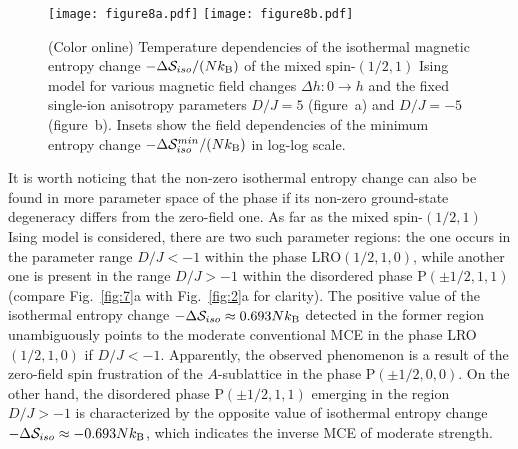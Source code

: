 \documentclass[final,5p,times,sort&compress]{elsarticle}
\begin{document}
\begin{figure*}[t!]
\centering
  \texttt{[image: figure8a.pdf]}
    \hspace{-0.25cm}
  \texttt{[image: figure8b.pdf]}
\vspace{-0.25cm}
\caption{(Color online) Temperature dependencies of the isothermal magnetic entropy change $-\Delta{\cal S}_{iso}/(Nk_{\rm B})$ of the mixed spin-$(1/2,1)$ Ising model for various magnetic field changes $\Delta h\!:0\to h$ and the fixed single-ion anisotropy parameters $D/J = 5$ (figure~a) and $D/J = -5$ (figure~b). Insets show the field dependencies of the minimum entropy change $-\Delta{\cal S}_{iso}^{min}/(Nk_{\rm B})$ in log-log scale.}
\label{fig:8}
\end{figure*}

It is worth noticing that the non-zero isothermal entropy change can also be found in more
parameter space of the phase if its non-zero ground-state degeneracy differs from the zero-field one. As far as the mixed spin-$(1/2,1)$ Ising model is considered, there are two such parameter regions: the one occurs in the parameter range $D/J<-1$ within the phase LRO$(1/2,1,0)$, while another one is present in the range $D/J>-1$ within the disordered phase P$(\pm1/2,1,1)$ (compare Fig.~\ref{fig:7}a with Fig.~\ref{fig:2}a for clarity). The positive value of the isothermal entropy change $-\Delta {\cal S}_{iso} \approx 0.693Nk_{\rm B}$ detected in the former region unambiguously points to the moderate conventional MCE in the phase LRO$(1/2,1,0)$ if $D/J<-1$. Apparently, the observed phenome\-non is a result of the zero-field spin frustration of the $A$-sublatti\-ce in the phase P$(\pm1/2,0,0)$.
On the other hand, the disordered phase P$(\pm1/2,1,1)$ emerging in the region $D/J>-1$ is characterized by the opposite value of isothermal entropy change $-\Delta {\cal S}_{iso} \approx -0.693Nk_{\rm B}$, which  indicates the inverse MCE of moderate strength.
\end{document}
